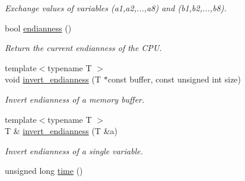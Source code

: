 \begin{DoxyCompactItemize}
\begin{DoxyCompactList}\small\item\em Exchange values of variables ({\ttfamily a1},{\ttfamily a2},...,{\ttfamily a8}) and ({\ttfamily b1},{\ttfamily b2},...,{\ttfamily b8}). \item\end{DoxyCompactList}\item 
bool \hyperlink{namespacecimg__library_1_1cimg_a0d2a283a3aa2572e9d343f040c8c4c6b}{endianness} ()
\begin{DoxyCompactList}\small\item\em Return the current endianness of the CPU. \item\end{DoxyCompactList}\item 
\hypertarget{namespacecimg__library_1_1cimg_a565abb2900eedfc3700ec2a87986bb89}{
{\footnotesize template$<$typename T $>$ }\\void \hyperlink{namespacecimg__library_1_1cimg_a565abb2900eedfc3700ec2a87986bb89}{invert\_\-endianness} (T $\ast$const buffer, const unsigned int size)}
\label{namespacecimg__library_1_1cimg_a565abb2900eedfc3700ec2a87986bb89}

\begin{DoxyCompactList}\small\item\em Invert endianness of a memory buffer. \item\end{DoxyCompactList}\item 
\hypertarget{namespacecimg__library_1_1cimg_a772f6feda6762af936e12436a26e40a3}{
{\footnotesize template$<$typename T $>$ }\\T \& \hyperlink{namespacecimg__library_1_1cimg_a772f6feda6762af936e12436a26e40a3}{invert\_\-endianness} (T \&a)}
\label{namespacecimg__library_1_1cimg_a772f6feda6762af936e12436a26e40a3}

\begin{DoxyCompactList}\small\item\em Invert endianness of a single variable. \item\end{DoxyCompactList}\item 
\hypertarget{namespacecimg__library_1_1cimg_af883131bbc64e996d212114cc2b2b21a}{
unsigned long \hyperlink{namespacecimg__library_1_1cimg_af883131bbc64e996d212114cc2b2b21a}{time} ()}
\label{namespacecimg__library_1_1cimg_af883131bbc64e996d212114cc2b2b21a}


\end{DoxyCompactItemize}
